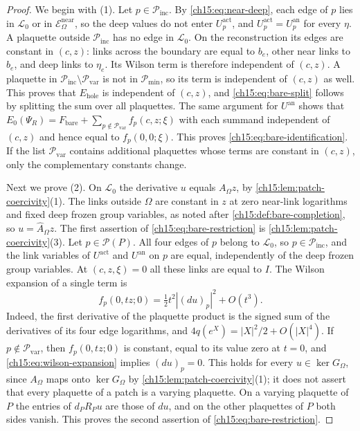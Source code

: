 \begin{proof}
We begin with (1). Let $p\in\mathcal P_{\mathrm{inc}}$. By \eqref{ch15:eq:near-deep}, each edge of $p$ lies in $\mathcal L_0$ or in $\mathcal E^{\mathrm{near}}_\Omega$, so the deep values do not enter $U^{\mathrm{act}}_p$, and $U^{\mathrm{act}}_p=U^{\mathrm{an}}_p$ for every $\eta$. A plaquette outside $\mathcal P_{\mathrm{inc}}$ has no edge in $\mathcal L_0$. On the reconstruction its edges are constant in $(c,z)$: links across the boundary are equal to $b_e$, other near links to $b_e$, and deep links to $\eta_e$. Its Wilson term is therefore independent of $(c,z)$. A plaquette in $\mathcal P_{\mathrm{inc}}\setminus\mathcal P_{\mathrm{var}}$ is not in $\mathcal P_{\min}$, so its term is independent of $(c,z)$ as well. This proves that $E_{\mathrm{hole}}$ is independent of $(c,z)$, and \eqref{ch15:eq:bare-split} follows by splitting the sum over all plaquettes. The same argument for $U^{\mathrm{an}}$ shows that $E_0(\Psi_R)=F_{\mathrm{bare}}+\sum_{p\notin\mathcal P_{\mathrm{var}}}f_p(c,z;\xi)$ with each summand independent of $(c,z)$ and hence equal to $f_p(0,0;\xi)$. This proves \eqref{ch15:eq:bare-identification}. If the list $\mathcal P_{\mathrm{var}}$ contains additional plaquettes whose terms are constant in $(c,z)$, only the complementary constants change.

Next we prove (2). On $\mathcal L_0$ the derivative $u$ equals $A_\Omega z$, by \cref{ch15:lem:patch-coercivity}(1). The links outside $\Omega$ are constant in $z$ at zero near-link logarithms and fixed deep frozen group variables, as noted after \cref{ch15:def:bare-completion}, so $u=\widehat A_\Omega z$. The first assertion of \eqref{ch15:eq:bare-restriction} is \cref{ch15:lem:patch-coercivity}(3). Let $p\in\mathcal P(P)$. All four edges of $p$ belong to $\mathcal L_0$, so $p\in\mathcal P_{\mathrm{inc}}$, and the link variables of $U^{\mathrm{act}}$ and $U^{\mathrm{an}}$ on $p$ are equal, independently of the deep frozen group variables. At $(c,z,\xi)=0$ all these links are equal to $I$. The Wilson expansion of a single term is
\begin{equation}\label{ch15:eq:wilson-expansion}
 f_p(0,tz;0)=\tfrac12t^2|(du)_p|^2+O(t^3).
\end{equation}
Indeed, the first derivative of the plaquette product is the signed sum of the derivatives of its four edge logarithms, and $4q(e^X)=|X|^2/2+O(|X|^4)$. If $p\notin\mathcal P_{\mathrm{var}}$, then $f_p(0,tz;0)$ is constant, equal to its value zero at $t=0$, and \eqref{ch15:eq:wilson-expansion} implies $(du)_p=0$. This holds for every $u\in\ker G_\Omega$, since $A_\Omega$ maps onto $\ker G_\Omega$ by \cref{ch15:lem:patch-coercivity}(1); it does not assert that every plaquette of a patch is a varying plaquette. On a varying plaquette of $P$ the entries of $d_PR_Pu$ are those of $du$, and on the other plaquettes of $P$ both sides vanish. This proves the second assertion of \eqref{ch15:eq:bare-restriction}.


\end{proof}

